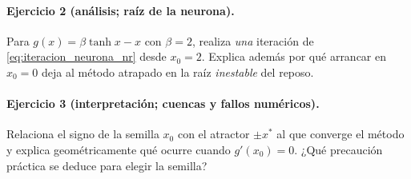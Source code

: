 \paragraph{Ejercicio 2 (análisis; raíz de la neurona).} Para $g(x)=\beta\tanh x - x$ con $\beta=2$, realiza \emph{una} iteración de \eqref{eq:iteracion_neurona_nr} desde $x_0=2$. Explica además por qué arrancar en $x_0=0$ deja al método atrapado en la raíz \emph{inestable} del reposo.

\paragraph{Ejercicio 3 (interpretación; cuencas y fallos numéricos).} Relaciona el signo de la semilla $x_0$ con el atractor $\pm x^*$ al que converge el método y explica geométricamente qué ocurre cuando $g'(x_0)=0$. ¿Qué precaución práctica se deduce para elegir la semilla?
